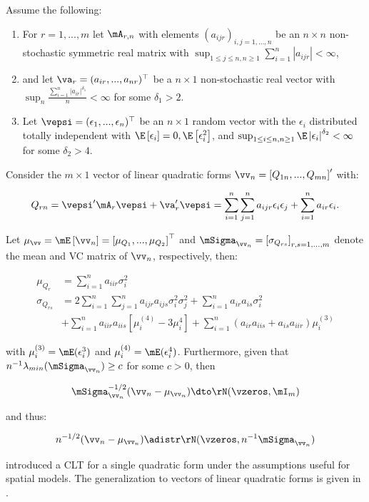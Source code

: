 \begin{theorem}\label{teo:clt_quadratic}
		Assume the following:
		\begin{enumerate}
			\item For $r = 1,...,m$ let $\mA_{r,n}$ with elements $(a_{ijr})_{i,j = 1,...,n}$ be an $n\times n$ non-stochastic symmetric real matrix with $\sup_{1\leq j \leq n, n\geq 1}\sum_{i = 1}^n|a_{ijr}| < \infty$,
			\item and let $\va_r = (a_{ir},...,a_{nr})^\top$ be a $n \times 1$ non-stochastic real vector with $\sup_{n}\frac{\sum_{i=1}^n \left|a_{ir}\right|^{\delta_1}}{n}<\infty$ for some $\delta_1 > 2$.
			\item Let $\vepsi = (\epsilon_1,...,\epsilon_n)^\top$ be an $n \times 1$ random vector with the $\epsilon_i$ distributed totally independent with $\E\left[\epsilon_i\right] = 0, \E\left[\epsilon_i^2\right]$, and  $\sup_{1 \leq i \leq n, n \geq 1}\E\left|\epsilon_{i}\right|^{\delta_2}<\infty$ for some $\delta_2 >4$. 
		\end{enumerate}
		Consider the $m \times 1$ vector of linear quadratic forms $\vv_n = \left[Q_{1n},..., Q_{mn}\right]'$ with:
		
		\begin{equation}
			Q_{rn}= \vepsi'\mA_r\vepsi + \va_r'\vepsi = \sum_{i=1}^n\sum_{j=1}^na_{ijr}\epsilon_i\epsilon_j + \sum_{i=1}^na_{ir}\epsilon_i.
		\end{equation}
		
		Let $\mu_{\vv} = \mE\left[\vv_n\right] = \left[\mu_{Q_1},...,\mu_{Q_2}\right]^\top$ and $\mSigma_{\vv_n} =\left[\sigma_{Q_{rs}}\right]_{r,s =1,...,m}$ denote the mean and VC matrix of $\vv_n$, respectively, then:
		
		\begin{equation*}
			\begin{aligned}
			\mu_{Q_r} & = \sum_{i = 1}^na_{iir}\sigma_i^2 \\
			 \sigma_{Q_{rs}} & = 2\sum_{i=1}^n\sum_{j =1}^na_{ijr}a_{ijs}\sigma^2_i\sigma_j^2 + \sum_{i = 1}^na_{ir}a_{is}\sigma_i^2 \\
			 	            & + \sum_{i = 1}^na_{iir}a_{iis}\left[\mu_i^{(4)} - 3\mu_i^{4}\right] + \sum_{i =1}^n(a_{ir}a_{iis} + a_{is}a_{iir})\mu_i^{(3)}
			\end{aligned}
		\end{equation*}
		
		with $\mu_i^{(3)} = \mE(\epsilon_i^3)$ and $\mu_i^{(4)} = \mE(\epsilon_i^4)$. Furthermore, given that $n^{-1}\lambda_{min}(\mSigma_{\vv_n})\geq c$ for some $c > 0$, then
		
		\begin{equation*}
		\mSigma_{\vv_n} ^{-1/2}(\vv_n - \mu_{\vv_n})\dto \rN(\vzeros, \mI_m)
		\end{equation*}
		
		and thus:
		
		\begin{equation*}
			n^{-1/2}(\vv_n - \mu_{\vv_n}) \adistr \rN(\vzeros, n^{-1}\mSigma_{\vv_n})
		\end{equation*}
\end{theorem}	

\cite{kelejian2001asymptotic} introduced a CLT for a single quadratic form under the assumptions useful for spatial models. The generalization to vectors of linear quadratic forms is given in \cite{kelejian2010specification}.
